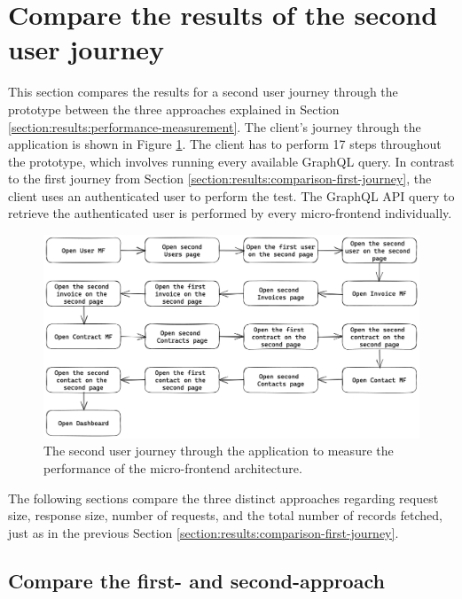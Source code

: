 \section{Compare the results of the second user journey}\label{section:results:comparison-second-journey}

This section compares the results for a second user journey through the prototype between the three approaches explained in Section \ref{section:results:performance-measurement}. The client's journey through the application is shown in Figure \ref{fig:results:evaluation-second-path}. The client has to perform 17 steps throughout the prototype, which involves running every available GraphQL query. In contrast to the first journey from Section \ref{section:results:comparison-first-journey}, the client uses an authenticated user to perform the test. The GraphQL \ac{API} query to retrieve the authenticated user is performed by every micro-frontend individually.

\ifshowImages
\begin{figure}[H]
  \centering
  \includegraphics[width=1\linewidth]{images/results/evaluation-second-path.png}
  \caption{The second user journey through the application to measure the performance of the micro-frontend architecture.}\label{fig:results:evaluation-second-path}
\end{figure}
\fi

\noindent The following sections compare the three distinct approaches regarding request size, response size, number of requests, and the total number of records fetched, just as in the previous Section \ref{section:results:comparison-first-journey}.

\subsection{Compare the first- and second-approach}\label{subsection:results:comparison-second-path-first-second-approach}

